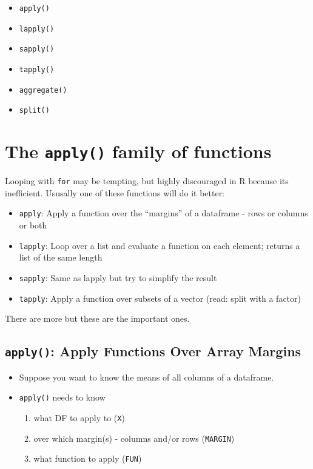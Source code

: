 \documentclass[]{book}
\providecommand{\tightlist}{%
  \setlength{\itemsep}{0pt}\setlength{\parskip}{0pt}}
\begin{document}
\begin{itemize}
\tightlist
\item
  \texttt{apply()}
\item
  \texttt{lapply()}
\item
  \texttt{sapply()}
\item
  \texttt{tapply()}
\item
  \texttt{aggregate()}
\item
  \texttt{split()}
\end{itemize}

\hypertarget{the-apply-family-of-functions}{%
\section{\texorpdfstring{The \texttt{apply()} family of functions}{The apply() family of functions}}\label{the-apply-family-of-functions}}

Looping with \texttt{for} may be tempting, but highly discouraged in R because its inefficient. Ususally one of these functions will do it better:

\begin{itemize}
\tightlist
\item
  \texttt{apply}: Apply a function over the ``margins'' of a dataframe - rows or columns or both
\item
  \texttt{lapply}: Loop over a list and evaluate a function on each element; returns a list of the same length
\item
  \texttt{sapply}: Same as lapply but try to simplify the result
\item
  \texttt{tapply}: Apply a function over subsets of a vector (read: split with a factor)
\end{itemize}

There are more but these are the important ones.

\hypertarget{apply-apply-functions-over-array-margins}{%
\subsection{\texorpdfstring{\texttt{apply()}: Apply Functions Over Array Margins}{apply(): Apply Functions Over Array Margins}}\label{apply-apply-functions-over-array-margins}}

\begin{itemize}
\tightlist
\item
  Suppose you want to know the means of all columns of a dataframe.
\item
  \texttt{apply()} needs to know

  \begin{enumerate}
  \def\labelenumi{\arabic{enumi}.}
  \tightlist
  \item
    what DF to apply to (\texttt{X})
  \item
    over which margin(s) - columns and/or rows (\texttt{MARGIN})
  \item
    what function to apply (\texttt{FUN})
  \end{enumerate}
\end{itemize}
\end{document}
